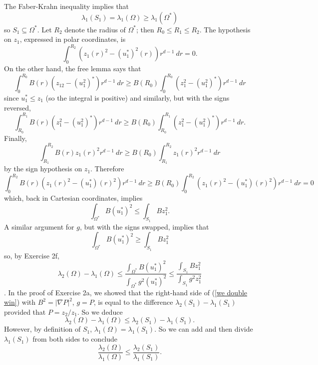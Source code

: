 \documentclass[10pt]{article}
\theoremstyle{definition}
\begin{document}
The Faber-Krahn inequality implies that
$$\lambda_1(S_1) = \lambda_1(\Omega) \geq \lambda_1(\Omega^*)$$
so $S_1 \subseteq \Omega^*$. Let $R_2$ denote the radius of $\Omega^*$; then $R_0 \leq R_1 \leq R_2$.
The hypothesis on $z_1$, expressed in polar coordinates, is
$$\int_0^{R_2} (z_1(r)^2 - (u_1^*)^2(r))r^{d-1} ~dr = 0.$$
On the other hand, the free lemma says that
$$\int_0^{R_0} B(r) (z_12 - (u_1^2)^*) r^{d-1} ~dr \geq B(R_0) \int_0^{R_0} (z_1^2 - (u_1^2)^*) r^{d-1} ~dr$$
since $u_1^* \leq z_1$ (so the integral is positive) and similarly, but with the signs reversed,
$$\int_{R_0}^{R_1} B(r) (z_1^2 - (u_1^2)^*) r^{d-1} ~dr \geq B(R_0) \int_{R_0}^{R_1} (z_1^2 - (u_1^2)^*) r^{d-1} ~dr.$$
Finally,
$$\int_{R_1}^{R_2} B(r) z_1(r)^2 r^{d-1} ~dr \geq B(R_0) \int_{R_1}^{R_2} z_1(r)^2 r^{d-1} ~dr$$
by the sign hypothesis on $z_1$.
Therefore
$$\int_0^{R_2} B(r) (z_1(r)^2 - (u_1^*)(r)^2) r^{d-1} ~dr \geq B(R_0) \int_0^{R_2} (z_1(r)^2 - (u_1^*)(r)^2) r^{d-1} ~dr = 0$$
which, back in Cartesian coordinates, implies
$$\int_{\Omega^*} B(u_1^*)^2 \leq \int_{S_1} Bz_1^2.$$
A similar argument for $g$, but with the signs swapped, implies that
$$\int_{\Omega^*} B(u_1^*)^2 \geq \int_{S_1} Bz_1^2$$
so, by Exercise 2f,
\begin{equation}
\label{we double win}
\lambda_2(\Omega) - \lambda_1(\Omega) \leq \frac{\int_{\Omega^*} B(u_1^*)^2}{\int_{\Omega^*} g^2 (u_1^*)^2} \leq \frac{\int_{S_1} Bz_1^2}{\int_{S_1} g^2 z_1^2}
\end{equation}.
In the proof of Exercise 2a, we showed that the right-hand side of (\ref{we double win}) with $B^2 = |\nabla P|^2$, $g = P$, is equal to the difference $\lambda_2(S_1) - \lambda_1(S_1)$ provided that $P = z_2/z_1$.
So we deduce
$$\lambda_2(\Omega) - \lambda_1(\Omega) \leq \lambda_2(S_1) - \lambda_1(S_1).$$
However, by definition of $S_1$, $\lambda_1(\Omega) = \lambda_1(S_1)$.
So we can add and then divide $\lambda_1(S_1)$ from both sides to conclude
$$\frac{\lambda_2(\Omega)}{\lambda_1(\Omega)} \leq \frac{\lambda_2(S_1)}{\lambda_1(S_1)}.$$
\end{document}
